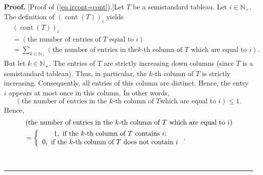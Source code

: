 \documentclass[numbers=enddot,12pt,final,onecolumn,notitlepage]{scrartcl}%
\theoremstyle{definition}
\newenvironment{proof}[1][Proof]{\noindent\textbf{#1.} }{\ \rule{0.5em}{0.5em}}
\newenvironment{verlong}{}{}
\let\sumnonlimits\sum
\renewcommand{\sum}{\sumnonlimits\limits}
\begin{document}
\begin{verlong}
\begin{proof}
[Proof of (\ref{eq.ircont=cont}).]Let $T$ be a semistandard tableau. Let
$i\in\mathbb{N}_{+}$. The definition of $\left(  \operatorname*{cont}\left(
T\right)  \right)  _{i}$ yields%
\begin{align}
&  \left(  \operatorname*{cont}\left(  T\right)  \right)  _{i}\nonumber\\
&  =\left(  \text{the number of entries of }T\text{ equal to }i\right)
\nonumber\\
&  =\sum_{k\in\mathbb{N}_{+}}\left(  \text{the number of entries in the
}k\text{-th column of }T\text{ which are equal to }i\right)  .
\label{pf.eq.ircont=cont.1}%
\end{align}
But let $k\in\mathbb{N}_{+}$. The entries of $T$ are strictly increasing down
columns (since $T$ is a semistandard tableau). Thus, in particular, the $k$-th
column of $T$ is strictly increasing. Consequently, all entries of this column
are distinct. Hence, the entry $i$ appears at most once in this column. In
other words,%
\[
\left(  \text{the number of entries in the }k\text{-th column of }T\text{
which are equal to }i\right)  \leq1.
\]
Hence,
\begin{align}
&  \left(  \text{the number of entries in the }k\text{-th column of }T\text{
which are equal to }i\right) \nonumber\\
&  =\left\{
\begin{array}
[c]{c}%
1,\ \text{if the }k\text{-th column of }T\text{ contains }i;\\
0,\ \text{if the }k\text{-th column of }T\text{ does not contain }i
\end{array}
\right.  . \label{pf.eq.ircont=cont.2}%
\end{align}



\end{proof}
\end{verlong}
\end{document}

